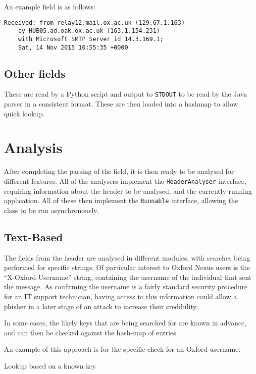 An example field is as follows:
\begin{verbatim}
Received: from relay12.mail.ox.ac.uk (129.67.1.163)
    by HUB05.ad.oak.ox.ac.uk (163.1.154.231)
    with Microsoft SMTP Server id 14.3.169.1;
    Sat, 14 Nov 2015 10:55:35 +0000
\end{verbatim}
\subsection{Other fields}

These are read by a Python script and output to \texttt{STDOUT} to be read by
the Java parser in a consistent format.  These are then loaded into a hashmap to
allow quick lookup.

\section{Analysis}

After completing the parsing of the field, it is then ready to be analysed for
different features.  All of the analysers implement the \texttt{HeaderAnalyser}
interface, requiring information about the header to be analysed, and the
currently running application.  All of these then implement the
\texttt{Runnable} interface, allowing the class to be run asynchronously.

\subsection{Text-Based}

The fields from the header are analysed in different modules, with searches
being performed for specific strings.  Of particular interest to Oxford Nexus
users is the ``X-Oxford-Username'' string, containing the username of the
individual that sent the message.  As confirming the username is a fairly
standard security procedure for an IT support technician, having access to this
information could allow a phisher in a later stage of an attack to increase
their credibility.

In some cases, the likely keys that are being searched for are known in advance,
and can then be checked against the hash-map of entries.

An example of this approach is for the specific check for an Oxford username:

\begin{algorithm}
	\caption{Lookup based on a known key}
\end{algorithm}

